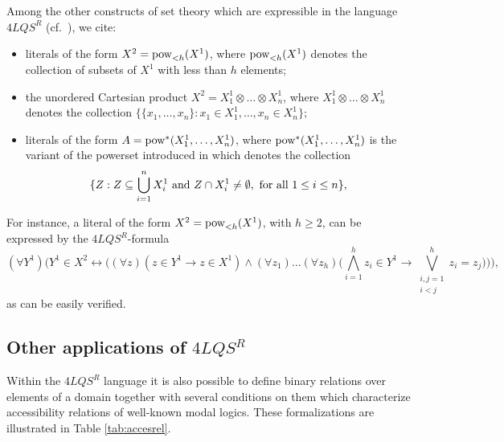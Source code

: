 \documentclass{fundam}
\renewcommand{\And}{\wedge}
\newcommand{\pow}{\mbox{\rm pow}}
\newcommand{\QLQSR}{\ensuremath{\mbox{$4\mathit{LQS}^{R}$}}\xspace}
\begin{document}
Among the other constructs of set theory which are expressible in the
language $\QLQSR$ (cf.\ \cite{CanNic08}), we cite:
\begin{itemize}

\item literals of the form $X^2 = \pow_{< h}(X^1)$, where $\pow_{<
h}(X^1)$ denotes the collection of subsets of $X^1$ with less than $h$
elements;

\item the unordered Cartesian product $X^2 = X_1^1 \otimes \ldots
\otimes X_n^1$, where $X_1^1 \otimes \ldots
\otimes X_n^1$ denotes the collection $\{\{ x_{1},\ldots,x_{n}\} : x_{1} \in X_1^1,
\ldots, x_{n} \in X_n^1\}$;

\item literals of the form $A = \pow^*(X_1^1,\ldots,X_n^1)$, where
$\pow^*(X_1^1,\ldots,X_n^1)$ is the variant of the powerset
introduced in \cite{Can91} which denotes the collection
$$
\{Z : Z \subseteq \bigcup_{i=1}^n X_i^1
         \hbox{ and } Z \cap X_i^1 \neq \emptyset,
         \hbox{ for all } 1 \leq i \leq n \},
$$
\end{itemize}
For instance, a literal of the form $X^2 = \pow_{< h}(X^1)$, with $h
\geq 2$, can be expressed by the $\QLQSR$-formula
\[
(\forall Y^{1})\Bigg(Y^{1} \in X^2 \leftrightarrow \Bigg( (\forall
z)\left(z
\in Y^{1} \rightarrow z \in X^1\right) \And
(\forall z_{1})\ldots(\forall z_{h})\Bigg(\bigwedge_{i=1}^{h} z_{i}
\in Y^1 \rightarrow \bigvee_{\substack{i,j=1\\i<j}}^{h} z_{i} = z_{j}\Bigg)
\!\Bigg)\!\Bigg),
\]
as can be easily verified.

\subsection{Other applications of $\QLQSR$}
Within the $\QLQSR$ language it is also possible to define binary
relations over elements of a domain together with several conditions
on them which characterize accessibility relations of well-known modal
logics.  These formalizations are illustrated in Table
\ref{tab:accesrel}.
\end{document}
